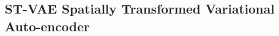 














\subsection{{\bf ST-VAE} Spatially Transformed Variational
  Auto-encoder}\label{sec:stvae}\vspace{-3mm} 


